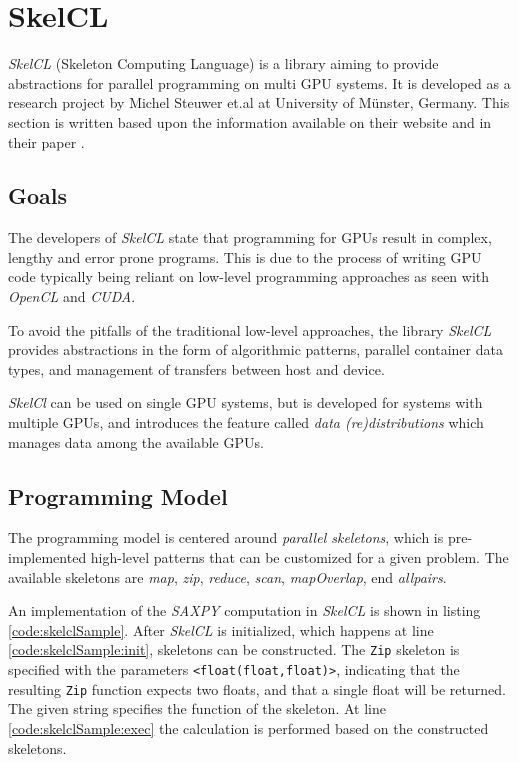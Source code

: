 \section{SkelCL}\label{cha:skelclRelatedWorks}
\textit{SkelCL} (Skeleton Computing Language) is a library aiming to provide abstractions for parallel programming on multi GPU systems. It is developed as a research project by Michel Steuwer et.al at University of Münster, Germany. This section is written based upon the information available on their website \cite{skelclWebsite} and in their paper \cite{skelclPaper}.

\subsection{Goals}
The developers of \textit{SkelCL} state that programming for GPUs result in complex, lengthy and error prone programs. This is due to the process of writing GPU code typically being reliant on low-level programming approaches as seen with \textit{OpenCL} and \textit{CUDA}. 

To avoid the pitfalls of the traditional low-level approaches, the library \textit{SkelCL} provides abstractions in the form of algorithmic patterns, parallel container data types, and management of transfers between host and device. 

\textit{SkelCl} can be used on single GPU systems, but is developed for systems with multiple GPUs, and introduces the feature called \textit{data (re)distributions} which manages data among the available GPUs.

\subsection{Programming Model}
The programming model is centered around \textit{parallel skeletons}, which is pre-implemented high-level patterns that can be customized for a given problem. The available skeletons are \textit{map}, \textit{zip}, \textit{reduce}, \textit{scan}, \textit{mapOverlap}, end \textit{allpairs}.

An implementation of the \textit{SAXPY} computation in \textit{SkelCL} is shown in listing \ref{code:skelclSample}. After \textit{SkelCL} is initialized, which happens at line \ref{code:skelclSample:init}, skeletons can be constructed. The \texttt{Zip} skeleton is specified with the parameters \texttt{<float(float,float)>}, indicating that the resulting \texttt{Zip} function expects two floats, and that a single float will be returned. The given string specifies the function of the skeleton. At line \ref{code:skelclSample:exec} the calculation is performed based on the constructed skeletons.

